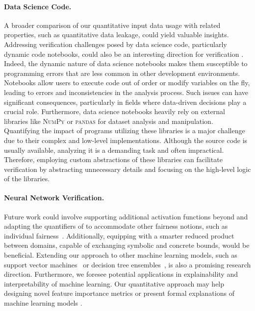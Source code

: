\paragraph{Data Science Code.}

A broader comparison of our quantitative input data usage with related properties, such as quantitative data leakage, could yield valuable insights.
Addressing verification challenges posed by data science code, particularly dynamic code notebooks, could also be an interesting direction for verification .
Indeed, the dynamic nature of data science notebooks makes them susceptible to programming errors that are less common in other development environments.
Notebooks allow users to execute code out of order or modify variables on the fly, leading to errors and inconsistencies in the analysis process.
Such issues can have significant consequences, particularly in fields where data-driven decisions play a crucial role.
Furthermore, data science notebooks heavily rely on external libraries like \textsc{NumPy} or \textsc{pandas} for dataset analysis and manipulation.
Quantifying the impact of programs utilizing these libraries is a major challenge due to their complex and low-level implementations.
Although the source code is usually available, analyzing it is a demanding task and often impractical.
Therefore, employing custom abstractions of these libraries can facilitate verification by abstracting unnecessary details and focusing on the high-level logic of the libraries.

\paragraph{Neural Network Verification.}

Future work could involve supporting additional activation functions beyond \relu{} and adapting the quantifiers of \libra{} to accommodate other fairness notions, such as individual fairness~.
Additionally, equipping \libra{} with a smarter reduced product between domains, capable of exchanging symbolic and concrete bounds, would be beneficial.
Extending our approach to other machine learning models, such as support vector machines~ or decision tree ensembles~, is also a promising research direction.
Furthermore, we foresee potential applications in explainability and interpretability of machine learning. Our quantitative approach may help designing novel feature importance metrics  or present formal explanations of machine learning models .


